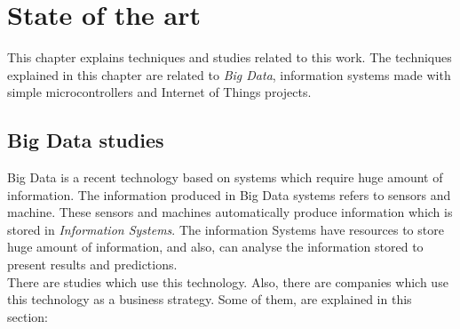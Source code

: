 
\chapter{State of the art}
\newpage

This chapter explains techniques and studies related to this work. The techniques explained in this chapter are related to \textit{Big Data}, information systems made with simple microcontrollers and Internet of Things projects.\\

\section{Big Data studies}

Big Data is a recent technology based on systems which require huge amount of information. The information produced in Big Data systems refers to sensors and machine. These sensors and machines automatically produce information which is stored in \textit{Information Systems}. The information Systems have resources to store huge amount of information, and also, can analyse the information stored to present results and predictions.\\

There are studies which use this technology. Also, there are companies which use this technology as a business strategy. Some of them, are explained in this section:

